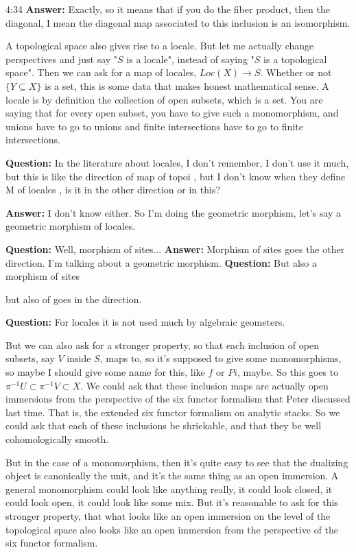 \begin{unfinished}{4:34}
\textbf{Answer:} Exactly, so it means that if you do the fiber product, then the diagonal, I mean the diagonal map associated to this inclusion is an isomorphism.

A topological space also gives rise to a locale. But let me actually change perspectives and just say "$S$ is a locale", instead of saying "$S$ is a topological space". 
Then we can ask for a map of locales, $Loc(X) \rightarrow S$. Whether or not $\{ Y \subseteq X \} $ is a set, this is some data that makes honest mathematical sense. A locale is by definition the collection of open subsets, which is a set. You are saying that for every open subset, you have to give such a monomorphism, and  unions have to go to unions and finite intersections have to go to finite intersections.

\textbf{Question:} In the literature about locales, I don't remember, I don't use it much, but this is like the direction of map of topoi \citeme{}, but I don't know when they define M of locales , is it in the other direction or in this? 

\textbf{Answer:} I don't know either. So I'm doing the geometric morphism, let's say a geometric morphism of locales. 

\textbf{Question:} Well, morphism of sites...
\textbf{Answer:} Morphism of sites goes the other direction. I'm talking about a geometric morphism. 
\textbf{Question:} But also a morphism of sites 

but also of goes in the direction.

\textbf{Question:} For locales it is not used much by algebraic geometers.


But we can also ask for a stronger property, so that each inclusion of open subsets, say $V$ inside $S$, maps to, so it's supposed to give some monomorphisms, so maybe I should give some name for this, like $f$ or $Pi$, maybe. So this goes to $\pi^{-1} U \subset \pi^{-1} V \subset X$. We could ask that these inclusion maps are actually open immersions from the perspective of the six functor formalism that Peter discussed last time. That is, the extended six functor formalism on analytic stacks. So we could ask that each of these inclusions be shriekable, and that they be well cohomologically smooth.

But in the case of a monomorphism, then it's quite easy to see that the dualizing object is canonically the unit, and it's the same thing as an open immersion. A general monomorphism could look like anything really, it could look closed, it could look open, it could look like some mix. But it's reasonable to ask for this stronger property, that what looks like an open immersion on the level of the topological space also looks like an open immersion from the perspective of the six functor formalism.


\end{unfinished}
